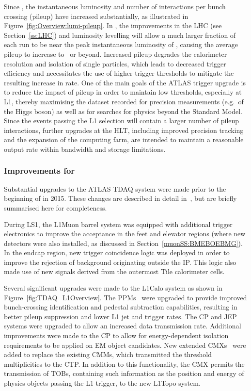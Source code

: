 \documentclass[cernpreprint, atlasdraft=false, UKenglish,british,orcidlogo, texmf, orcidlogo]{atlasdoc}
\begin{document}
Since \RunOne, the instantaneous luminosity and number of interactions per bunch crossing (pileup) have increased substantially, as illustrated in Figure~\ref{fig:Overview:lumi-pileup}.  In \RunThr, the improvements in the \gls{LHC} (see Section~\ref{ss:LHC}) and luminosity levelling will allow a much larger fraction of each run to be near the peak instantaneous luminosity of \lumirunthree, causing the average pileup to increase to \murunthree\ or beyond. Increased pileup degrades the calorimeter resolution and isolation of single particles, which leads to decreased trigger efficiency and necessitates the use of higher trigger thresholds to mitigate the resulting increase in rate.  One of the main goals of the ATLAS trigger upgrade is to reduce the impact of pileup in order to maintain low thresholds, especially at \gls{L1}, thereby maximising the dataset recorded for precision measurements (e.g.\ of the Higgs boson) as well as for searches for physics beyond the Standard Model.  Since the events passing the \gls{L1} selection will contain a larger number of pileup interactions, further upgrades at the \gls{HLT}, including improved precision tracking and the expansion of the computing farm, are intended to maintain a reasonable output rate within bandwidth and storage limitations.
 
\subsubsection{Improvements for \RunTwo}
 
Substantial upgrades to the ATLAS \gls{TDAQ} system were made prior to the beginning of \RunTwo in 2015.  These changes are described in detail in~\cite{TRIG-2016-01}, but are briefly summarised here for completeness.
 
During \gls{LS1}, the \gls{L1Muon} barrel system was equipped with additional trigger electronics to improve the acceptance in the feet and elevator regions (where new detectors were also installed, as discussed in Section~\ref{muonSS:BMEBOEBMG}).  In the endcap region, new trigger coincidence logic was deployed in order to improve the rejection of background originating outside the \gls{IP}.
This logic also made use of new signals derived from the outermost Tile calorimeter cells.
 
Several significant upgrades were made to the \gls{L1Calo} system as shown in Figure~\ref{fig:TDAQ_L1Overview}.   The \glspl{PPM}~\cite{TDAQ-2019-01} were upgraded to provide improved bunch-crossing identification and pedestal subtraction capabilities, resulting in better pileup suppression and lower \gls{L1} jet and \MET trigger rates.  The \gls{CP} and \gls{JEP} systems were upgraded to allow an increased data transmission rate. Additional improvements were made to the \gls{CP} to allow for energy-dependent isolation requirements to be applied on \gls{EM} object candidates.  New extended \glspl{CMX}~\cite{TRIG-2016-01} were added to replace the existing \glspl{CMM}, which transmitted the threshold multiplicities to the \gls{CTP}.  In addition to this functionality, the \gls{CMX} permits the transmission of \glspl{TOB}, containing such information as the position and energy of physics objects passing the \gls{L1} trigger, to the new \gls{L1Topo} system.
 
\end{document}

